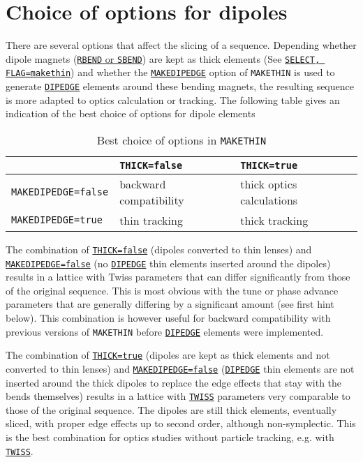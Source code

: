 \section{Choice of options for dipoles}

There are several options that affect the slicing of a sequence. 
Depending whether dipole magnets (\hyperref[sec:bend]{\texttt{RBEND} 
or \texttt{SBEND}}) are kept as thick elements 
(See \hyperref[sec:select]{\texttt{SELECT, FLAG=makethin}}) and 
whether the \hyperref[sec:makethin]{\texttt{MAKEDIPEDGE}} option 
of \texttt{MAKETHIN} is used to generate 
\hyperref[sec:dipedge]{\texttt{DIPEDGE}} elements around these bending magnets, 
the resulting sequence is more adapted to optics calculation or tracking. 
The following table gives an indication of the best choice of options for 
dipole elements 

\begin{table}[ht]
  \caption{Best choice of options in \texttt{MAKETHIN}}
  \vspace{1ex}
  \centering
  \begin{tabular}{|l|l|l|}
    \hline
    & \texttt{THICK=false} & \texttt{THICK=true}\\
    \hline
    \texttt{MAKEDIPEDGE=false} & backward compatibility & thick optics calculations \\
    \hline
    \texttt{MAKEDIPEDGE=true} & thin tracking & thick tracking \\
    \hline
  \end{tabular}
\end{table}

The combination of \hyperref[sec:numberofslices]{\texttt{THICK=false}} 
(dipoles converted to thin lenses) 
and \hyperref[sec:makethin]{\texttt{MAKEDIPEDGE=false}} 
(no \hyperref[sec:dipedge]{\texttt{DIPEDGE}} 
thin elements inserted around the dipoles) results in a lattice with 
Twiss parameters that can differ significantly from those of 
the original sequence. 
This is most obvious with the tune or phase advance parameters 
that are generally differing by a significant amount (see first 
hint below). This combination is however useful for backward compatibility 
with previous versions of \texttt{MAKETHIN} before 
\hyperref[sec:dipedge]{\texttt{DIPEDGE}} elements were
implemented. 

The combination of \hyperref[sec:numberofslices]{\texttt{THICK=true}} 
(dipoles are kept as thick elements and not converted to thin lenses) 
and \hyperref[sec:makethin]{\texttt{MAKEDIPEDGE=false}} 
(\hyperref[sec:dipedge]{\texttt{DIPEDGE}} thin elements 
are not inserted around the thick dipoles to replace the edge effects 
that stay with the bends themselves) 
results in a lattice with \hyperref[chap:twiss]{\texttt{TWISS}} parameters 
very comparable to those of the original sequence. The dipoles are still 
thick elements, eventually sliced, with proper edge effects up to second 
order, although non-symplectic.
This is the best combination for optics studies without particle tracking, 
e.g. with \hyperref[chap:twiss]{\texttt{TWISS}}. 


